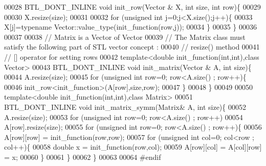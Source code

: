 \begin{DoxyCode}
00028 BTL\_DONT\_INLINE \textcolor{keywordtype}{void} init\_row(Vector & X, \textcolor{keywordtype}{int} size, \textcolor{keywordtype}{int} row)\{
00029 
00030   X.resize(size);
00031 
00032   \textcolor{keywordflow}{for} (\textcolor{keywordtype}{unsigned} \textcolor{keywordtype}{int} j=0;j<X.size();j++)\{
00033     X[j]=\textcolor{keyword}{typename} Vector::value\_type(init\_function(row,j));
00034   \}
00035 \}
00036 
00037 
00038 \textcolor{comment}{// Matrix is a Vector of Vector}
00039 \textcolor{comment}{// The Matrix class must satisfy the following part of STL vector concept :}
00040 \textcolor{comment}{//            resize() method}
00041 \textcolor{comment}{//            [] operator for setting rows}
00042 \textcolor{keyword}{template}<\textcolor{keywordtype}{double} init\_function(\textcolor{keywordtype}{int},\textcolor{keywordtype}{int}),\textcolor{keyword}{class} Vector>
00043 BTL\_DONT\_INLINE \textcolor{keywordtype}{void} init\_matrix(Vector &  A, \textcolor{keywordtype}{int} size)\{
00044   A.resize(size);
00045   \textcolor{keywordflow}{for} (\textcolor{keywordtype}{unsigned} \textcolor{keywordtype}{int} row=0; row<A.size() ; row++)\{
00046     init\_row<init\_function>(A[row],size,row);
00047   \}
00048 \}
00049 
00050 \textcolor{keyword}{template}<\textcolor{keywordtype}{double} init\_function(\textcolor{keywordtype}{int},\textcolor{keywordtype}{int}),\textcolor{keyword}{class} Matrix>
00051 BTL\_DONT\_INLINE \textcolor{keywordtype}{void} init\_matrix\_symm(Matrix&  A, \textcolor{keywordtype}{int} size)\{
00052   A.resize(size);
00053   \textcolor{keywordflow}{for} (\textcolor{keywordtype}{unsigned} \textcolor{keywordtype}{int} row=0; row<A.size() ; row++)
00054     A[row].resize(size);
00055   \textcolor{keywordflow}{for} (\textcolor{keywordtype}{unsigned} \textcolor{keywordtype}{int} row=0; row<A.size() ; row++)\{
00056     A[row][row] = init\_function(row,row);
00057     \textcolor{keywordflow}{for} (\textcolor{keywordtype}{unsigned} \textcolor{keywordtype}{int} col=0; col<row ; col++)\{
00058       \textcolor{keywordtype}{double} x = init\_function(row,col);
00059       A[row][col] = A[col][row] = x;
00060     \}
00061   \}
00062 \}
00063 
00064 \textcolor{preprocessor}{#endif}
\end{DoxyCode}
